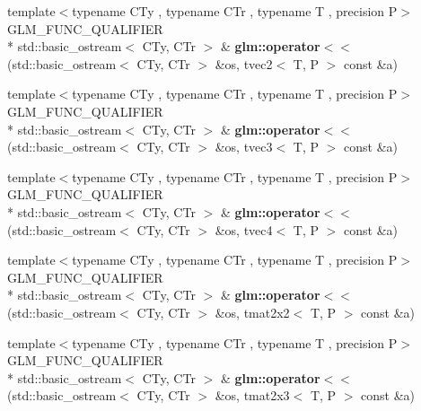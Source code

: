 \begin{DoxyCompactItemize}
\item 
\hypertarget{group__gtx__io_ga0a3bca262adbba991f394d8d3d52e10d}{{\footnotesize template$<$typename C\-Ty , typename C\-Tr , typename T , precision P$>$ }\\G\-L\-M\-\_\-\-F\-U\-N\-C\-\_\-\-Q\-U\-A\-L\-I\-F\-I\-E\-R \\*
std\-::basic\-\_\-ostream$<$ C\-Ty, C\-Tr $>$ \& {\bfseries glm\-::operator$<$$<$} (std\-::basic\-\_\-ostream$<$ C\-Ty, C\-Tr $>$ \&os, tvec2$<$ T, P $>$ const \&a)}\label{group__gtx__io_ga0a3bca262adbba991f394d8d3d52e10d}

\item 
\hypertarget{group__gtx__io_ga0d6cfb5d138639b90f18d7bbb2a4ae56}{{\footnotesize template$<$typename C\-Ty , typename C\-Tr , typename T , precision P$>$ }\\G\-L\-M\-\_\-\-F\-U\-N\-C\-\_\-\-Q\-U\-A\-L\-I\-F\-I\-E\-R \\*
std\-::basic\-\_\-ostream$<$ C\-Ty, C\-Tr $>$ \& {\bfseries glm\-::operator$<$$<$} (std\-::basic\-\_\-ostream$<$ C\-Ty, C\-Tr $>$ \&os, tvec3$<$ T, P $>$ const \&a)}\label{group__gtx__io_ga0d6cfb5d138639b90f18d7bbb2a4ae56}

\item 
\hypertarget{group__gtx__io_ga948ab426a879f24236d8978ee9b5fade}{{\footnotesize template$<$typename C\-Ty , typename C\-Tr , typename T , precision P$>$ }\\G\-L\-M\-\_\-\-F\-U\-N\-C\-\_\-\-Q\-U\-A\-L\-I\-F\-I\-E\-R \\*
std\-::basic\-\_\-ostream$<$ C\-Ty, C\-Tr $>$ \& {\bfseries glm\-::operator$<$$<$} (std\-::basic\-\_\-ostream$<$ C\-Ty, C\-Tr $>$ \&os, tvec4$<$ T, P $>$ const \&a)}\label{group__gtx__io_ga948ab426a879f24236d8978ee9b5fade}

\item 
\hypertarget{group__gtx__io_ga61fbdb6ad70c4c8d750a847251fa4a4a}{{\footnotesize template$<$typename C\-Ty , typename C\-Tr , typename T , precision P$>$ }\\G\-L\-M\-\_\-\-F\-U\-N\-C\-\_\-\-Q\-U\-A\-L\-I\-F\-I\-E\-R \\*
std\-::basic\-\_\-ostream$<$ C\-Ty, C\-Tr $>$ \& {\bfseries glm\-::operator$<$$<$} (std\-::basic\-\_\-ostream$<$ C\-Ty, C\-Tr $>$ \&os, tmat2x2$<$ T, P $>$ const \&a)}\label{group__gtx__io_ga61fbdb6ad70c4c8d750a847251fa4a4a}

\item 
\hypertarget{group__gtx__io_ga032043616f87c7eefaf4d83a20f779a5}{{\footnotesize template$<$typename C\-Ty , typename C\-Tr , typename T , precision P$>$ }\\G\-L\-M\-\_\-\-F\-U\-N\-C\-\_\-\-Q\-U\-A\-L\-I\-F\-I\-E\-R \\*
std\-::basic\-\_\-ostream$<$ C\-Ty, C\-Tr $>$ \& {\bfseries glm\-::operator$<$$<$} (std\-::basic\-\_\-ostream$<$ C\-Ty, C\-Tr $>$ \&os, tmat2x3$<$ T, P $>$ const \&a)}\label{group__gtx__io_ga032043616f87c7eefaf4d83a20f779a5}


\end{DoxyCompactItemize}

